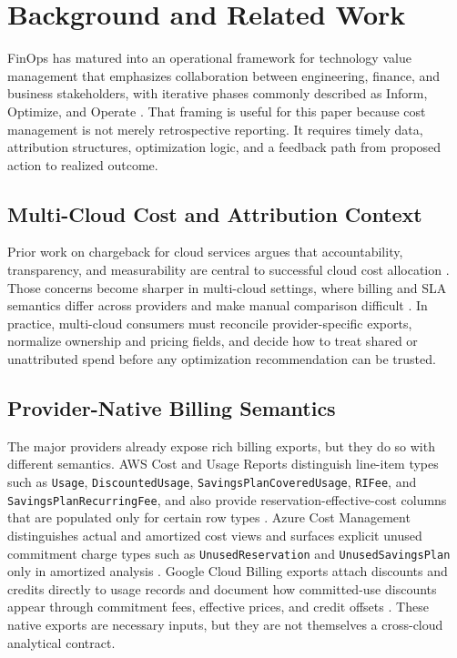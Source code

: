 \section{Background and Related Work}

FinOps has matured into an operational framework for technology value management that emphasizes collaboration between engineering, finance, and business stakeholders, with iterative phases commonly described as Inform, Optimize, and Operate \cite{finops_framework,finops_phases}. That framing is useful for this paper because cost management is not merely retrospective reporting. It requires timely data, attribution structures, optimization logic, and a feedback path from proposed action to realized outcome.

\subsection{Multi-Cloud Cost and Attribution Context}
Prior work on chargeback for cloud services argues that accountability, transparency, and measurability are central to successful cloud cost allocation \cite{baars2014chargeback}. Those concerns become sharper in multi-cloud settings, where billing and SLA semantics differ across providers and make manual comparison difficult \cite{gupta2016streamlining,imran2020multicloud}. In practice, multi-cloud consumers must reconcile provider-specific exports, normalize ownership and pricing fields, and decide how to treat shared or unattributed spend before any optimization recommendation can be trusted.

\subsection{Provider-Native Billing Semantics}
The major providers already expose rich billing exports, but they do so with different semantics. AWS Cost and Usage Reports distinguish line-item types such as \texttt{Usage}, \texttt{DiscountedUsage}, \texttt{SavingsPlanCoveredUsage}, \texttt{RIFee}, and \texttt{SavingsPlanRecurringFee}, and also provide reservation-effective-cost columns that are populated only for certain row types \cite{aws_line_items,aws_reservation_details}. Azure Cost Management distinguishes actual and amortized cost views and surfaces explicit unused commitment charge types such as \texttt{UnusedReservation} and \texttt{UnusedSavingsPlan} only in amortized analysis \cite{azure_amortized_cost,azure_unused_reservation}. Google Cloud Billing exports attach discounts and credits directly to usage records and document how committed-use discounts appear through commitment fees, effective prices, and credit offsets \cite{gcp_cud_overview,gcp_standard_export}. These native exports are necessary inputs, but they are not themselves a cross-cloud analytical contract.

